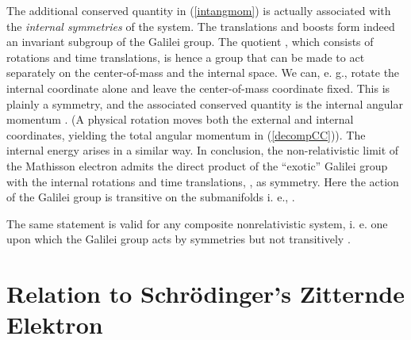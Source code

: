 \documentclass[a4paper,11pt]{article}
\let\ssection=\section
\renewcommand{\section}{\setcounter{equation}{0}\ssection}
\providecommand{\SO}[1]{{\mathop{\rm SO}}({#1})}
\providecommand{\IR}{{\bf R}}
\providecommand{\const}{\mathop{\rm const}\nolimits}
\def\vQ{{\vec Q}}
\def\vX{{\vec X}}
\begin{document}
The additional conserved quantity \coordHE{} in
(\ref{intangmom}) is actually associated with
the {\it internal symmetries}  of the system.
The translations and boosts form indeed an invariant
subgroup \coordHE{} of the Galilei group.
The quotient \coordHE{}, which consists of
rotations and time translations, is hence a group that can be made to
act separately on the center-of-mass and the internal space.
We can, e. g., rotate
the internal coordinate \myHighlight{$\vQ$}\coordHE{} alone and leave the center-of-mass
coordinate \myHighlight{$\vX$}\coordHE{} fixed. This is plainly a symmetry,
and the associated conserved quantity is the
internal angular momentum \coordHE{}. (A physical rotation
moves both the external and internal coordinates, yielding
the total angular momentum in (\ref{decompCC})).
The internal energy arises in a similar way.
In conclusion, the non-relativistic limit of the
Mathisson electron admits the direct product
of the ``exotic'' Galilei group with the internal
rotations and time translations, \myHighlight{$\SO2\times \IR$}\coordHE{}, as symmetry.
Here the action of the Galilei group is transitive on the
submanifolds \myHighlight{$I=\const$}\coordHE{} i. e., \myHighlight{$\vQ^2=\const$}\coordHE{}.

The same statement is valid for any composite
nonrelativistic system, i. e. one
upon which the Galilei group acts by symmetries but not
transitively \cite{SSD}.

\section{Relation to Schr\"odinger's Zitternde Elektron}\label{Zitter}
\end{document}
